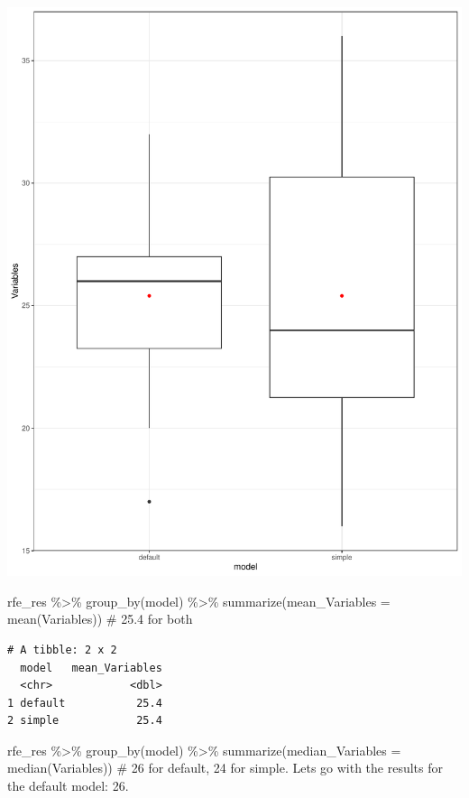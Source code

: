 \documentclass[
  letterpaper,
  DIV=11,
  numbers=noendperiod]{scrartcl}
\newenvironment{Shaded}{\begin{snugshade}}{\end{snugshade}}
\newcommand{\AttributeTok}[1]{\textcolor[rgb]{0.40,0.45,0.13}{#1}}
\newcommand{\CommentTok}[1]{\textcolor[rgb]{0.37,0.37,0.37}{#1}}
\newcommand{\FunctionTok}[1]{\textcolor[rgb]{0.28,0.35,0.67}{#1}}
\newcommand{\NormalTok}[1]{\textcolor[rgb]{0.00,0.23,0.31}{#1}}
\newcommand{\SpecialCharTok}[1]{\textcolor[rgb]{0.37,0.37,0.37}{#1}}
\begin{document}
\includegraphics{MachineLearning_StaticPatterNN_Report_files/figure-pdf/rfe-results-1.pdf}

\begin{Shaded}
\begin{Highlighting}[]
\NormalTok{rfe\_res }\SpecialCharTok{\%\textgreater{}\%} \FunctionTok{group\_by}\NormalTok{(model) }\SpecialCharTok{\%\textgreater{}\%} \FunctionTok{summarize}\NormalTok{(}\AttributeTok{mean\_Variables =} \FunctionTok{mean}\NormalTok{(Variables)) }\CommentTok{\# 25.4 for both}
\end{Highlighting}
\end{Shaded}

\begin{verbatim}
# A tibble: 2 x 2
  model   mean_Variables
  <chr>            <dbl>
1 default           25.4
2 simple            25.4
\end{verbatim}

\begin{Shaded}
\begin{Highlighting}[]
\NormalTok{rfe\_res }\SpecialCharTok{\%\textgreater{}\%} \FunctionTok{group\_by}\NormalTok{(model) }\SpecialCharTok{\%\textgreater{}\%} \FunctionTok{summarize}\NormalTok{(}\AttributeTok{median\_Variables =} \FunctionTok{median}\NormalTok{(Variables)) }\CommentTok{\# 26 for default, 24 for simple. Let\textquotesingle{}s go with the results for the default model: 26.}
\end{Highlighting}
\end{Shaded}
\end{document}
